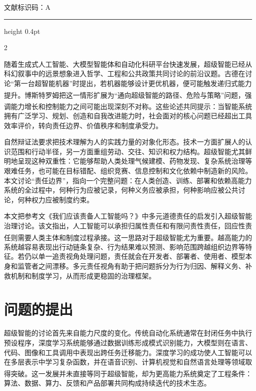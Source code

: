 \documentclass[a4paper,UTF8,zihao=5,twoside]{ctexart}
\newcommand{\upcite}[1]{\textsuperscript{\cite{#1}}}
\newcommand{\kwsep}{\quad}
\begin{document}
\vspace{0.35em}
\kwsep
{\heiti 文献标识码：}{\songti A}

\vspace{0.8em}
\hrule height 0.4pt
\vspace{0.65em}

\begin{multicols}{2}

随着生成式人工智能、大模型智能体和自动化科研平台快速发展，超级智能已经从科幻叙事中的远景想象进入哲学、工程和公共政策共同讨论的前沿议题。古德在讨论“第一台超智能机器”时提出，若机器能够设计更优机器，便可能触发递归式能力提升\upcite{good1965}。博斯特罗姆把这一情形扩展为“通向超级智能的路径、危险与策略”问题，强调能力增长和控制能力之间可能出现深刻不对称\upcite{bostrom2014}。这些论述共同提示：当智能系统拥有广泛学习、规划、创造和自我改进能力时，社会面对的核心问题已经超出工具效率评价，转向责任边界、价值秩序和制度承受力。

自然辩证法要求把技术理解为人的实践力量的对象化形态。技术一方面扩展人的认识范围和行动半径，另一方面重组劳动、交往、知识和权力结构。超级智能尤其鲜明地呈现这种双重性：它能够帮助人类处理气候建模、药物发现、复杂系统治理等艰难任务，也可能在目标错配、组织竞赛、信息控制和文化依赖中制造新的风险。本文讨论“责任边界”，指向一个完整问题：在人类创造、训练、部署和依赖高能力系统的全过程中，何种行为应被记录，何种义务应被承担，何种影响应被公共讨论，何种权力应被制度约束。

本文把参考文《我们应该责备人工智能吗？》中多元道德责任的启发引入超级智能治理讨论。该文指出，人工智能可以承担归属性责任和有限问责性责任，回应性责任则需要人类主体和制度过程承接\upcite{tan2026}。这一思路对于超级智能尤为重要。越高能力的系统越容易表现出行动链条复杂、行为结果难以预测、影响范围跨越组织边界等特征。若仍以单一追责视角处理问题，责任就会在开发者、部署者、使用者、模型本身和监管者之间漂移。多元责任视角有助于把问题拆分为行为归因、解释义务、补救机制和制度学习，从而形成更稳固的治理框架。

\section{问题的提出}

超级智能的讨论首先来自能力尺度的变化。传统自动化系统通常在封闭任务中执行预设程序，深度学习系统能够通过数据训练形成模式识别能力，大模型则在语言、代码、图像和工具调用中表现出跨任务迁移能力。深度学习的成功使人工智能可以在多层表示中学习复杂函数，并在语音识别、计算机视觉和自然语言处理等领域取得突破\upcite{lecun2015}。这一发展并未直接等同于超级智能，却为更高能力系统奠定了工程条件：算法、数据、算力、反馈和产品部署共同构成持续迭代的技术生态。


\end{multicols}
\end{document}
